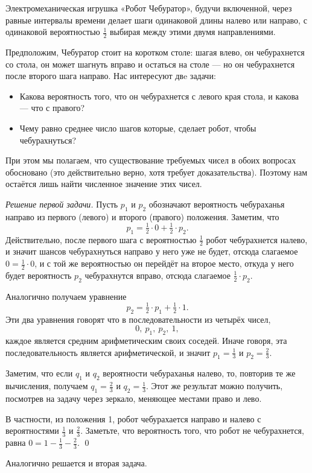 \documentclass{article}
\begin{document}
Электромеханическая игрушка «Робот Чебуратор», 
будучи включенной, через равные интервалы времени делает шаги одинаковой длины налево или направо, с одинаковой вероятностью $\tfrac12$ выбирая между этими двумя направлениями. 

Предположим, Чебуратор стоит на коротком столе:
шагая влево, он чебурахнется со стола,
он может шагнуть вправо и остаться на столе --- но он чебурахнется после второго шага направо.
Нас интересуют двe задачи:
\begin{itemize}
\item Какова вероятность того, что он чебурахнется с левого края стола, и какова --- что с правого?
\item Чему равно среднее число шагов которые, сделает робот, чтобы чебурахнуться?
\end{itemize}
При этом мы полагаем, что существование требуемых чисел в обоих вопросах обосновано
(это действительно верно, хотя требует доказательства).
Поэтому нам остаётся лишь найти
численное значение этих чисел. 

\medskip
\noindent\textit{Решение первой задачи.}
Пусть $p_1$ и $p_2$ обозначают вероятность чебураханья направо из первого (левого) и второго (правого) положения. 
Заметим, что
\[p_1=\tfrac12\cdot0+\tfrac12\cdot p_2.\]
Действительно, после первого шага 
с вероятностью $\tfrac12$ робот чебурахнется налево,
и значит шансов чебурахнуться направо у него уже не будет, 
отсюда слагаемое $0=\tfrac12\cdot0$,
и с той же вероятностью он перейдёт на второе место,
откуда у него будет вероятность $p_2$ чебурахнутся вправо,
отсюда слагаемое $\tfrac12\cdot p_2$.

Аналогично получаем уравнение 
\[p_2=\tfrac12\cdot p_1+\tfrac12\cdot 1.\]
Эти два уравнения говорят что в последовательности из четырёх чисел, 
\[0,\  p_1,\  p_2,\ 1,\]
каждое является средним арифметическим своих соседей.
Иначе говоря, эта последовательность является арифметической, 
и значит $p_1=\tfrac13$ и $p_2=\tfrac23$.

Заметим, что если $q_1$ и $q_2$ вероятности чебураханья налево, 
то, повторив те же вычисления, получаем $q_1=\tfrac23$ и $q_2=\tfrac13$.
Этот же результат можно получить, посмотрев на задачу через зеркало, меняющее местами право и лево.

В частности, из положения 1, робот чебурахается направо и налево с вероятностями $\tfrac13$ и $\tfrac23$.
Заметьте, что вероятность того, что 
робот не чебурахнется, равна $0=1-\tfrac13-\tfrac23$.
\qed
\medskip

Аналогично решается и вторая задача.
\end{document}
